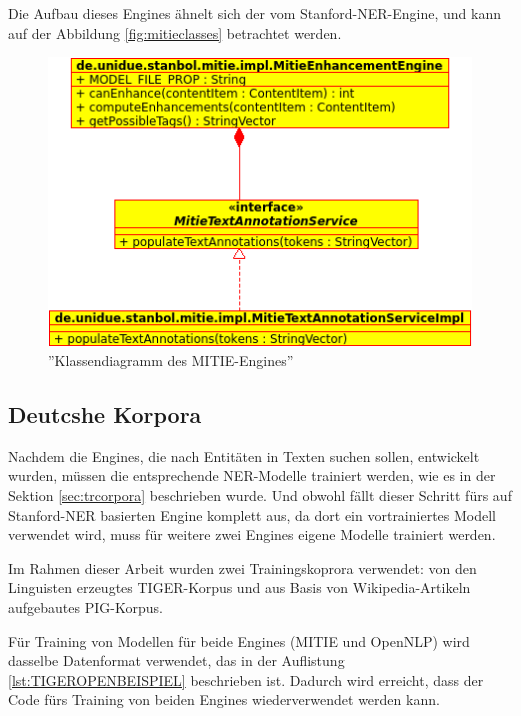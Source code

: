Die Aufbau dieses Engines ähnelt sich der vom Stanford-NER-Engine, und kann auf der Abbildung \ref{fig:mitieclasses} betrachtet werden.

\begin{figure}[ht]
\centering
\includegraphics[width=\textwidth]{Bilder/mitie-classes.png}
\caption{''Klassendiagramm  des MITIE-Engines''}
\label{fig:onlpuml}
\end{figure}

\subsection{Deutcshe Korpora} \label{subsec:decor}
Nachdem die Engines, die nach Entitäten in Texten suchen sollen, entwickelt wurden, müssen die entsprechende NER-Modelle trainiert werden, wie es in der Sektion \ref{sec:trcorpora} beschrieben wurde. Und obwohl fällt dieser Schritt fürs auf Stanford-NER basierten Engine komplett aus, da dort ein vortrainiertes Modell verwendet wird, muss für weitere zwei Engines eigene Modelle trainiert werden.

Im Rahmen dieser Arbeit wurden zwei Trainingskoprora verwendet: von den Linguisten erzeugtes TIGER-Korpus und aus Basis von Wikipedia-Artikeln aufgebautes PIG-Korpus.

Für Training von Modellen für beide Engines (MITIE und OpenNLP) wird dasselbe Datenformat verwendet, das in der Auflistung \ref{lst:TIGEROPENBEISPIEL} beschrieben ist. Dadurch wird erreicht, dass der Code fürs Training von beiden Engines wiederverwendet werden kann.



